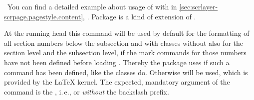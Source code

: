 \else %
  \ You can find a detailed example about usage of  with
   in
  \autoref{sec:scrlayer-scrpage.pagestyle.content},
  . Package
   is a kind of extension of .%
\fi %
%
%
%
%

\fi %
\fi %


\ifshortversion\IgnoreThisfalse{}\fi
\ifIgnoreThis %
\else %
\ifCommonscrlayerscrpage\else %
\begin{Declaration}
\end{Declaration}
%
At the running head this command will be used by default for the formatting of
all section numbers below the subsection and with classes without
 also for the section level and the subsection level, if the
mark commands for those numbers have not been defined before loading
. Thereby the package uses  if such
a command has been defined, like the \KOMAScript{} classes do. Otherwise
 will be used, which is provided by the \LaTeX{}
kernel. The expected, mandatory argument of the command is the , i.\,e.,  or 
\emph{without} the backslash prefix.

